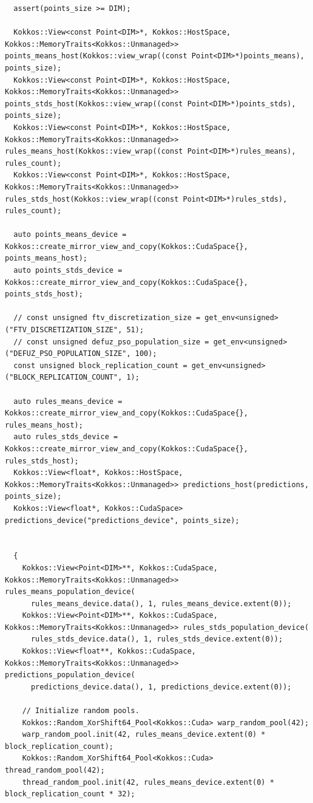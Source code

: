 \begin{verbatim}
  assert(points_size >= DIM);

  Kokkos::View<const Point<DIM>*, Kokkos::HostSpace, Kokkos::MemoryTraits<Kokkos::Unmanaged>> points_means_host(Kokkos::view_wrap((const Point<DIM>*)points_means), points_size);
  Kokkos::View<const Point<DIM>*, Kokkos::HostSpace, Kokkos::MemoryTraits<Kokkos::Unmanaged>> points_stds_host(Kokkos::view_wrap((const Point<DIM>*)points_stds), points_size);
  Kokkos::View<const Point<DIM>*, Kokkos::HostSpace, Kokkos::MemoryTraits<Kokkos::Unmanaged>> rules_means_host(Kokkos::view_wrap((const Point<DIM>*)rules_means), rules_count);
  Kokkos::View<const Point<DIM>*, Kokkos::HostSpace, Kokkos::MemoryTraits<Kokkos::Unmanaged>> rules_stds_host(Kokkos::view_wrap((const Point<DIM>*)rules_stds), rules_count);

  auto points_means_device = Kokkos::create_mirror_view_and_copy(Kokkos::CudaSpace{}, points_means_host);
  auto points_stds_device = Kokkos::create_mirror_view_and_copy(Kokkos::CudaSpace{}, points_stds_host);

  // const unsigned ftv_discretization_size = get_env<unsigned>("FTV_DISCRETIZATION_SIZE", 51);
  // const unsigned defuz_pso_population_size = get_env<unsigned>("DEFUZ_PSO_POPULATION_SIZE", 100);
  const unsigned block_replication_count = get_env<unsigned>("BLOCK_REPLICATION_COUNT", 1);

  auto rules_means_device = Kokkos::create_mirror_view_and_copy(Kokkos::CudaSpace{}, rules_means_host);
  auto rules_stds_device = Kokkos::create_mirror_view_and_copy(Kokkos::CudaSpace{}, rules_stds_host);
  Kokkos::View<float*, Kokkos::HostSpace, Kokkos::MemoryTraits<Kokkos::Unmanaged>> predictions_host(predictions, points_size);
  Kokkos::View<float*, Kokkos::CudaSpace> predictions_device("predictions_device", points_size);


  {
    Kokkos::View<Point<DIM>**, Kokkos::CudaSpace, Kokkos::MemoryTraits<Kokkos::Unmanaged>> rules_means_population_device(
      rules_means_device.data(), 1, rules_means_device.extent(0));
    Kokkos::View<Point<DIM>**, Kokkos::CudaSpace, Kokkos::MemoryTraits<Kokkos::Unmanaged>> rules_stds_population_device(
      rules_stds_device.data(), 1, rules_stds_device.extent(0));
    Kokkos::View<float**, Kokkos::CudaSpace, Kokkos::MemoryTraits<Kokkos::Unmanaged>> predictions_population_device(
      predictions_device.data(), 1, predictions_device.extent(0));

    // Initialize random pools.
    Kokkos::Random_XorShift64_Pool<Kokkos::Cuda> warp_random_pool(42);
    warp_random_pool.init(42, rules_means_device.extent(0) * block_replication_count);
    Kokkos::Random_XorShift64_Pool<Kokkos::Cuda> thread_random_pool(42);
    thread_random_pool.init(42, rules_means_device.extent(0) * block_replication_count * 32);


\end{verbatim}

